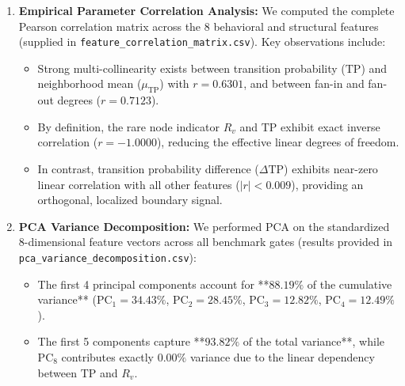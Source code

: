 \documentclass[11pt,a4paper]{article}
\begin{document}
\begin{enumerate}[leftmargin=*]
    \item \textbf{Empirical Parameter Correlation Analysis:}
    We computed the complete Pearson correlation matrix across the 8 behavioral and structural features (supplied in \texttt{feature\_correlation\_matrix.csv}). Key observations include:
    \begin{itemize}
        \item Strong multi-collinearity exists between transition probability ($\text{TP}$) and neighborhood mean ($\mu_{\text{TP}}$) with $r = 0.6301$, and between fan-in and fan-out degrees ($r = 0.7123$).
        \item By definition, the rare node indicator $R_v$ and $\text{TP}$ exhibit exact inverse correlation ($r = -1.0000$), reducing the effective linear degrees of freedom.
        \item In contrast, transition probability difference ($\Delta \text{TP}$) exhibits near-zero linear correlation with all other features ($|r| < 0.009$), providing an orthogonal, localized boundary signal.
    \end{itemize}

    \item \textbf{PCA Variance Decomposition:}
    We performed PCA on the standardized 8-dimensional feature vectors across all benchmark gates (results provided in \texttt{pca\_variance\_decomposition.csv}):
    \begin{itemize}
        \item The first 4 principal components account for **$88.19\%$ of the cumulative variance** ($\text{PC}_1 = 34.43\%$, $\text{PC}_2 = 28.45\%$, $\text{PC}_3 = 12.82\%$, $\text{PC}_4 = 12.49\%$).
        \item The first 5 components capture **$93.82\%$ of the total variance**, while $\text{PC}_8$ contributes exactly $0.00\%$ variance due to the linear dependency between $\text{TP}$ and $R_v$.
    \end{itemize}


\end{enumerate}
\end{document}

